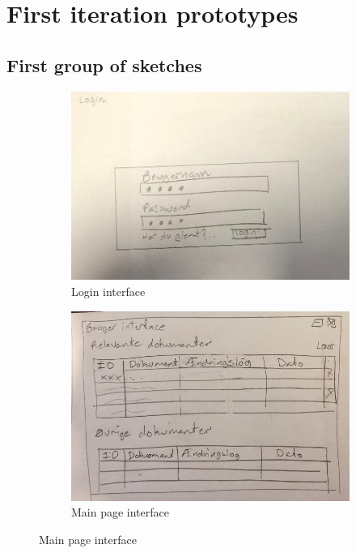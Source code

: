 \chapter{First iteration prototypes}
\section{First group of sketches}
\begin{figure}[H]
		\centering
		\begin{subfigure}[b]{0.48\textwidth}
			\includegraphics[width=\textwidth]{billeder/login-view.jpg}
			\caption{Login interface}
			\label{fig:1-Login}
		\end{subfigure}
		\quad
		\begin{subfigure}[b]{0.48\textwidth}
			\includegraphics[width=\textwidth]{billeder/Main-view.jpg}
			\caption{Main page interface}
			\label{fig:1-Main}
		\end{subfigure}
\end{figure}
